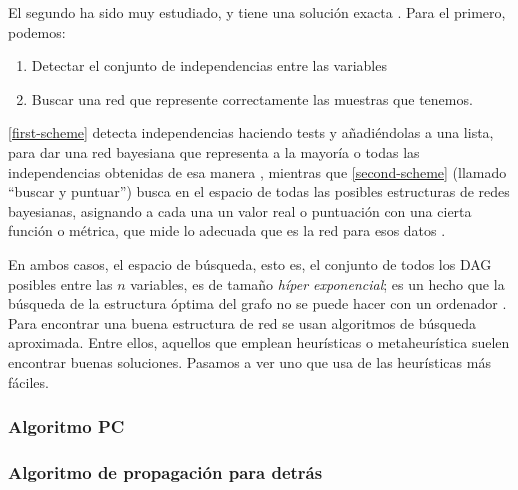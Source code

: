 El segundo ha sido muy estudiado, y tiene una solución exacta \cite{neapolitan}. Para el primero, podemos:
\begin{enumerate}
    \item \label{first-scheme} Detectar el conjunto de independencias entre las variables
    \item \label{second-scheme} Buscar una red que represente correctamente las muestras que tenemos.
\end{enumerate}
    

\ref{first-scheme} detecta independencias haciendo tests y añadiéndolas a una lista, para dar una red 
bayesiana que representa a la mayoría o todas las independencias obtenidas de esa manera \cite{learning-algorithms-BN-comparison}, 
mientras que \ref{second-scheme} (llamado ``buscar y puntuar'') busca en el espacio de todas las posibles estructuras 
de redes bayesianas, asignando a cada una un valor real o puntuación con una cierta función o métrica, que mide lo 
adecuada que es la red para esos datos \cite{more-algorithms}.

En ambos casos, el espacio de búsqueda, esto es, el conjunto de todos los DAG posibles entre las $n$ variables, 
es de tamaño {\em híper exponencial}; es un hecho que la búsqueda de la estructura óptima del grafo no se puede 
hacer con un ordenador \cite{Chickering}. Para encontrar una buena estructura de red se usan algoritmos de búsqueda 
aproximada. Entre ellos, aquellos que emplean heurísticas o metaheurística suelen encontrar buenas soluciones. Pasamos 
a ver uno que usa de las heurísticas más fáciles.

\subsubsection{Algoritmo PC}

\subsubsection{Algoritmo de propagación para detrás}
